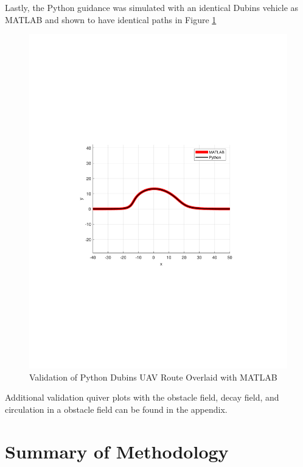 \documentclass[numbered,pdftex]{ohio-etd}
\begin{document}
Lastly, the Python guidance was simulated with an identical Dubins vehicle as MATLAB and shown to have identical paths in Figure \ref{fig:pythonMATDubins}


\begin{figure}[H]
	\centering
	\includegraphics[trim=0 240 0 260,clip,width=16cm]{PaperFigures/Methods/resultsPython/dubinsPaths}
	\caption{Validation of Python Dubins UAV Route Overlaid with MATLAB}
	\label{fig:pythonMATDubins}
\end{figure}

Additional validation quiver plots with the obstacle field, decay field, and circulation in a obstacle field can be found in the appendix. 


\section{Summary of Methodology}
\end{document}
